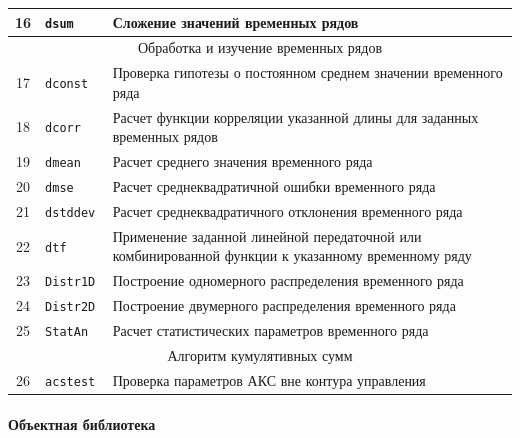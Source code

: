 \begin{table}
\begin{tabular}{|c|l|p{13cm}|}
16 & \tt dsum & Сложение значений временных рядов \\
\hline
\multicolumn{3}{|c|}{Обработка и изучение временных рядов} \\
\hline
17 & \tt dconst & Проверка гипотезы о постоянном среднем значении временного ряда \\
18 & \tt dcorr & Расчет функции корреляции указанной длины для заданных временных рядов \\
19 & \tt dmean & Расчет среднего значения временного ряда \\
20 & \tt dmse & Расчет среднеквадратичной ошибки временного ряда \\
21 & \tt dstddev & Расчет среднеквадратичного отклонения временного ряда \\
22 & \tt dtf & Применение заданной линейной передаточной или комбинированной функции к указанному временному ряду  \\
23 & \tt Distr1D & Построение одномерного распределения временного ряда \\
24 & \tt Distr2D & Построение двумерного распределения временного ряда \\
25 & \tt StatAn & Расчет статистических параметров временного ряда \\
\hline
\multicolumn{3}{|c|}{Алгоритм кумулятивных сумм} \\
\hline
26 & \tt acstest & Проверка параметров АКС вне контура управления \\
\hline
\end{tabular}
\end{table}


\paragraph{Объектная библиотека}

